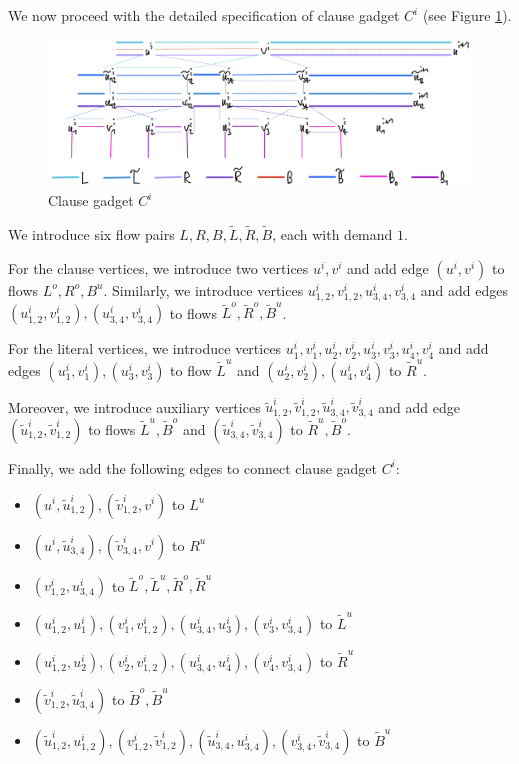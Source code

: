 \documentclass[fontsize=11pt,paper=a4]{book}
\begin{document}
We now proceed with the detailed specification of clause gadget \(C^i\) (see Figure \ref{fig:orgd02ab13}).

\begin{figure}[htbp]
\centering
\includegraphics[width=.9\linewidth]{../assets/Screen Shot 2023-02-14 at 15.07.03.png}
\caption{\label{fig:orgd02ab13}Clause gadget \(C^i\)}
\end{figure}

We introduce six flow pairs \(L,R,B,\tilde{L},\tilde{R},\tilde{B}\), each with demand \(1\).

For the clause vertices, we introduce two vertices \(u^i,v^i\) and add edge \((u^i,v^i)\) to flows \(L^o,R^o,B^u\).
Similarly, we introduce vertices \(u_{1,2}^i,v_{1,2}^i,u_{3,4}^i,v_{3,4}^i\) and add edges \((u_{1,2}^i,v_{1,2}^i),(u_{3,4}^i,v_{3,4}^i)\) to flows \(\tilde{L}^o,\tilde{R}^o,\tilde{B}^u\).

For the literal vertices, we introduce vertices \(u_1^i,v_1^i,u_2^i,v_2^i,u_3^i,v_3^i,u_4^i,v_4^i\) and add edges \((u_1^i,v_1^i),(u_3^i,v_3^i)\) to flow \(\tilde{L}^u\) and \((u_2^i,v_2^i),(u_4^i,v_4^i)\) to \(\tilde{R}^u\).

Moreover, we introduce auxiliary vertices \(\tilde{u}_{1,2}^i,\tilde{v}_{1,2}^i,\tilde{u}_{3,4}^i,\tilde{v}_{3,4}^i\) and add edge \((\tilde{u}_{1,2}^i,\tilde{v}_{1,2}^i)\) to flows \(\tilde{L}^u,\tilde{B}^o\) and \((\tilde{u}_{3,4}^i,\tilde{v}_{3,4}^i)\) to \(\tilde{R}^u,\tilde{B}^o\).

Finally, we add the following edges to connect clause gadget \(C^i\):

\begin{itemize}
\item \((u^i,\tilde{u}_{1,2}^i),(\tilde{v}_{1,2}^i,v^i)\) to \(L^u\)
\item \((u^i,\tilde{u}_{3,4}^i),(\tilde{v}_{3,4}^i,v^i)\) to \(R^u\)
\item \((v_{1,2}^i,u_{3,4}^i)\) to \(\tilde{L}^o,\tilde{L}^u,\tilde{R}^o,\tilde{R}^u\)
\item \((u_{1,2}^i,u_1^i),(v_1^i,v_{1,2}^i),(u_{3,4}^i,u_3^i),(v_3^i,v_{3,4}^i)\) to \(\tilde{L}^u\)
\item \((u_{1,2}^i,u_2^i),(v_2^i,v_{1,2}^i),(u_{3,4}^i,u_4^i),(v_4^i,v_{3,4}^i)\) to \(\tilde{R}^u\)
\item \((\tilde{v}_{1,2}^i,\tilde{u}_{3,4}^i)\) to \(\tilde{B}^o,\tilde{B}^u\)
\item \((\tilde{u}_{1,2}^i,u_{1,2}^i),(v_{1,2}^i,\tilde{v}_{1,2}^i),(\tilde{u}_{3,4}^i,u_{3,4}^i),(v_{3,4}^i,\tilde{v}_{3,4}^i)\) to \(\tilde{B}^u\)
\end{itemize}
\end{document}
